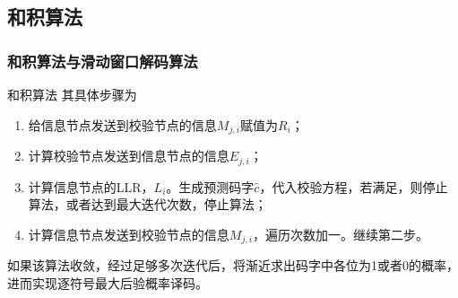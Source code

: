 \documentclass{beamer}
\begin{document}
\subsection{和积算法}
\begin{frame}[shrink]
    \frametitle{和积算法与滑动窗口解码算法}
        \begin{block}{和积算法}
        其具体步骤为
\begin{enumerate}
\item 给信息节点发送到校验节点的信息$M_{j,i}$赋值为$R_i$；
\item 计算校验节点发送到信息节点的信息$E_{j,i}$；
\item 计算信息节点的LLR，$L_i$。生成预测码字$\hat{c}$，代入校验方程，若满足，则停止算法，或者达到最大迭代次数，停止算法；
\item 计算信息节点发送到校验节点的信息$M_{j,i}$，遍历次数加一。继续第二步。
\end{enumerate}
如果该算法收敛，经过足够多次迭代后，将渐近求出码字中各位为1或者0的概率，进而实现逐符号最大后验概率译码。
        \end{block}
\end{frame}
\end{document}
